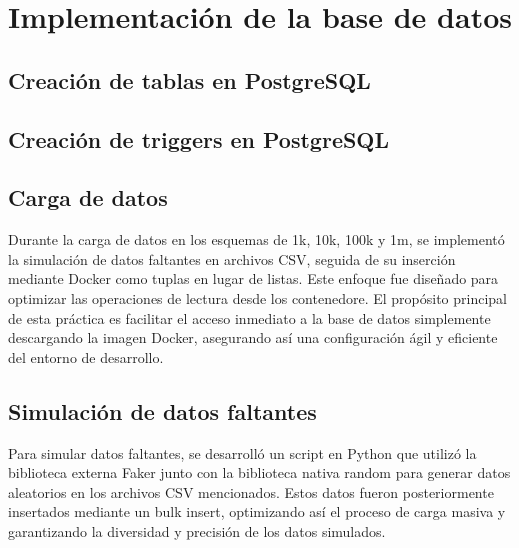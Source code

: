 \section{Implementación de la base de datos}
\subsection{Creación de tablas en PostgreSQL}

\subsection{Creación de triggers en PostgreSQL}

\subsection{Carga de datos}{Durante la carga de datos en los esquemas de 1k, 10k, 100k y 1m, se implementó la simulación de datos faltantes en archivos CSV, seguida de su inserción mediante Docker como tuplas en lugar de listas. Este enfoque fue diseñado para optimizar las operaciones de lectura desde los contenedore. El propósito principal de esta práctica es facilitar el acceso inmediato a la base de datos simplemente descargando la imagen Docker, asegurando así una configuración ágil y eficiente del entorno de desarrollo.}
\subsection{Simulación de datos faltantes}{Para simular datos faltantes, se desarrolló un script en Python que utilizó la biblioteca externa Faker junto con la biblioteca nativa random para generar datos aleatorios en los archivos CSV mencionados. Estos datos fueron posteriormente insertados mediante un bulk insert, optimizando así el proceso de carga masiva y garantizando la diversidad y precisión de los datos simulados.}